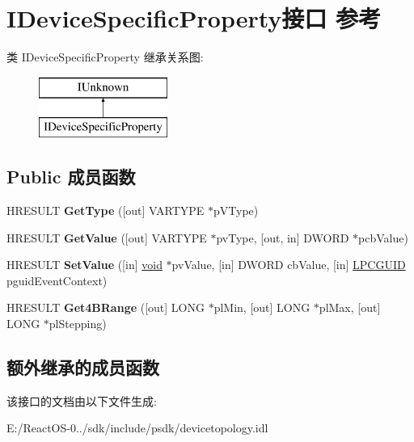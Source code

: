 \hypertarget{interface_i_device_specific_property}{}\section{I\+Device\+Specific\+Property接口 参考}
\label{interface_i_device_specific_property}
类 I\+Device\+Specific\+Property 继承关系图\+:\begin{figure}[H]
\begin{center}
\leavevmode
\includegraphics[height=2.000000cm]{interface_i_device_specific_property}
\end{center}
\end{figure}
\subsection*{Public 成员函数}
\begin{DoxyCompactItemize}
\item 
\mbox{\label{interface_i_device_specific_property_aa1f891f0a74d74ed69c2a483e94137b6}} 
H\+R\+E\+S\+U\+LT {\bfseries Get\+Type} (\mbox{[}out\mbox{]} V\+A\+R\+T\+Y\+PE $\ast$p\+V\+Type)
\item 
\mbox{\label{interface_i_device_specific_property_afaa0dbfcff17c4ec497637c2d249c847}} 
H\+R\+E\+S\+U\+LT {\bfseries Get\+Value} (\mbox{[}out\mbox{]} V\+A\+R\+T\+Y\+PE $\ast$pv\+Type, \mbox{[}out, in\mbox{]} D\+W\+O\+RD $\ast$pcb\+Value)
\item 
\mbox{\label{interface_i_device_specific_property_ad562ba073b54ae05598ed44a9fd00800}} 
H\+R\+E\+S\+U\+LT {\bfseries Set\+Value} (\mbox{[}in\mbox{]} \hyperlink{interfacevoid}{void} $\ast$pv\+Value, \mbox{[}in\mbox{]} D\+W\+O\+RD cb\+Value, \mbox{[}in\mbox{]} \hyperlink{interface_g_u_i_d}{L\+P\+C\+G\+U\+ID} pguid\+Event\+Context)
\item 
\mbox{\label{interface_i_device_specific_property_a3432fcee899e2d4e7436540e02c47b91}} 
H\+R\+E\+S\+U\+LT {\bfseries Get4\+B\+Range} (\mbox{[}out\mbox{]} L\+O\+NG $\ast$pl\+Min, \mbox{[}out\mbox{]} L\+O\+NG $\ast$pl\+Max, \mbox{[}out\mbox{]} L\+O\+NG $\ast$pl\+Stepping)
\end{DoxyCompactItemize}
\subsection*{额外继承的成员函数}


该接口的文档由以下文件生成\+:\begin{DoxyCompactItemize}
\item 
E\+:/\+React\+O\+S-\/0../sdk/include/psdk/devicetopology.\+idl\end{DoxyCompactItemize}
